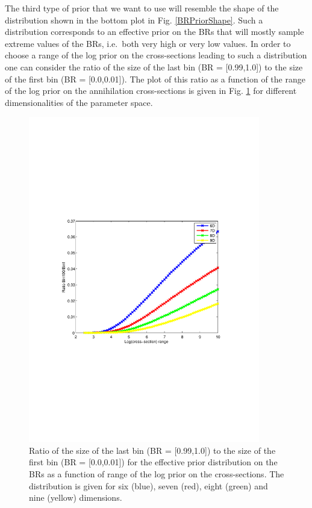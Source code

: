 \documentclass{article}
\begin{document}
The third type of prior that we want to use will resemble the shape of the distribution shown in the bottom plot in Fig. \ref{BRPriorShape}. Such a distribution corresponds to an effective prior on the BRs that will mostly sample extreme values of the BRs, i.e.\ both very high or very low values. In order to choose a range of the log prior on the cross-sections leading to such a distribution one can consider the ratio of the size of the last bin (BR = [0.99,1.0]) to the size of the first bin (BR = [0.0,0.01]). The plot of this ratio as a function of the range of the log prior on the annihilation cross-sections is given in Fig. \ref{Bin100Bin1} for different dimensionalities of the parameter space.
\begin{figure}
\centering
\includegraphics[trim = 70 240 90 240, clip = true, width=0.9\textwidth]{figs/Ratio_Bin100_Bin1}
\caption{Ratio of the size of the last bin (BR = [0.99,1.0]) to the size of the first bin (BR = [0.0,0.01]) for the effective prior distribution on the BRs as a function of range of the log prior on the cross-sections. The distribution is given for six (blue), seven (red), eight (green) and nine (yellow) dimensions.}
\label{Bin100Bin1}
\end{figure}
\end{document}
